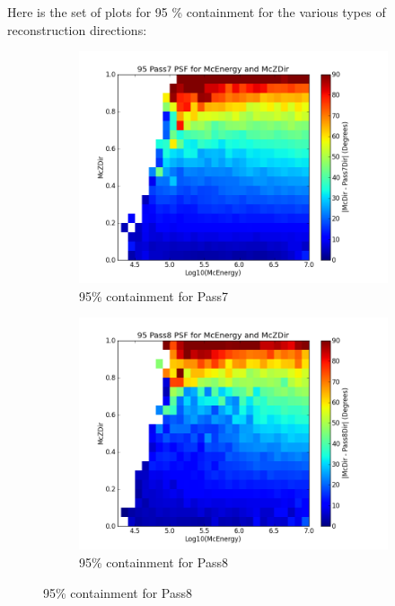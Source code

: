 \documentclass[11pt]{article}
\begin{document}
\newpage
Here is the set of plots for 95 \% containment for the various types of reconstruction directions:

\begin{figure}[h]
        \centering
        \begin{subfigure}[b]{0.5\textwidth}
                \centering
                \includegraphics[width=\textwidth]{psf95_2D_pass7}
                \caption{95\% containment for Pass7}
                \label{con95_old}
        \end{subfigure}%
        \begin{subfigure}[b]{0.5\textwidth}
                \centering
                \includegraphics[width=\textwidth]{psf95_2D_pass8}
                \caption{95\% containment for Pass8}

\end{subfigure}
\end{figure}
\end{document}
